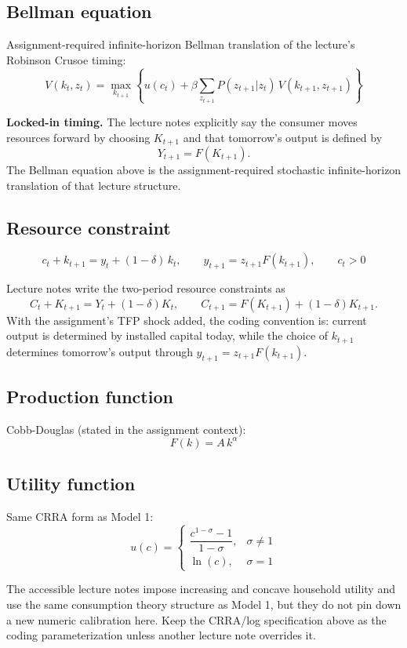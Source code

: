 \documentclass[11pt]{article}
\begin{document}
\subsection{Bellman equation}
Assignment-required infinite-horizon Bellman translation of the lecture's Robinson Crusoe timing:
\[
V(k_t,z_t) = \max_{k_{t+1}} \left\{ u(c_t) + \beta \sum_{z_{t+1}} P(z_{t+1}|z_t)\,V(k_{t+1},z_{t+1}) \right\}
\]

\begin{warningbox}
\textbf{Locked-in timing.} The lecture notes explicitly say the consumer moves resources forward by choosing $K_{t+1}$ and that tomorrow's output is defined by
\[
Y_{t+1} = F(K_{t+1}).
\]
The Bellman equation above is the assignment-required stochastic infinite-horizon translation of that lecture structure.
\end{warningbox}

\subsection{Resource constraint}
\[
c_t + k_{t+1} = y_t + (1-\delta)\,k_t, \qquad y_{t+1} = z_{t+1}F(k_{t+1}), \qquad c_t > 0
\]

\begin{notebox}
Lecture notes write the two-period resource constraints as
\[
C_t + K_{t+1} = Y_t + (1-\delta)K_t, \qquad C_{t+1} = F(K_{t+1}) + (1-\delta)K_{t+1}.
\]
With the assignment's TFP shock added, the coding convention is: current output is determined by installed capital today, while the choice of $k_{t+1}$ determines tomorrow's output through $y_{t+1} = z_{t+1}F(k_{t+1})$.
\end{notebox}

\subsection{Production function}
Cobb-Douglas (stated in the assignment context):
\[
F(k) = A\,k^\alpha
\]

\subsection{Utility function}
Same CRRA form as Model 1:
\[
u(c) =
\begin{cases}
\dfrac{c^{1-\sigma}-1}{1-\sigma}, & \sigma \neq 1 \\[0.5em]
\ln(c), & \sigma = 1
\end{cases}
\]

\begin{notebox}
The accessible lecture notes impose increasing and concave household utility and use the same consumption theory structure as Model 1, but they do not pin down a new numeric calibration here. Keep the CRRA/log specification above as the coding parameterization unless another lecture note overrides it.
\end{notebox}
\end{document}
